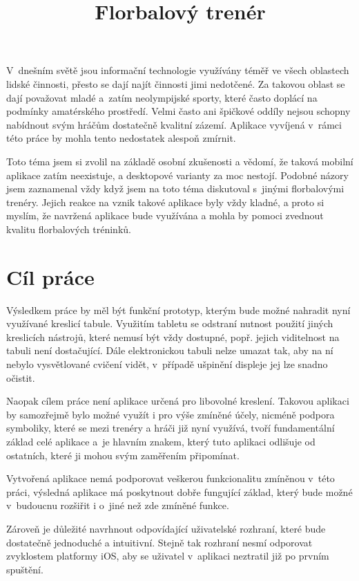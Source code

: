\documentclass[thesis=B,czech]{FITthesis}[2012/06/26]
\title{Florbalový trenér}
\begin{document}

\begin{introduction}
	V~dnešním světě jsou informační technologie využívány téměř ve všech oblastech lidské činnosti, přesto se dají najít činnosti jimi nedotčené. Za takovou oblast se dají považovat mladé a~zatím neolympijské sporty, které často doplácí na podmínky amatérského prostředí. Velmi často ani špičkové oddíly nejsou schopny nabídnout svým hráčům dostatečně kvalitní zázemí. Aplikace vyvíjená v~rámci této práce by mohla tento nedostatek alespoň zmírnit.

	Toto téma jsem si zvolil na základě osobní zkušenosti a vědomí, že taková mobilní aplikace zatím neexistuje, a desktopové varianty za moc nestojí. Podobné názory jsem zaznamenal vždy když jsem na toto téma diskutoval s~jinými florbalovými trenéry. Jejich reakce na vznik takové aplikace byly vždy kladné, a proto si myslím, že navržená aplikace bude využívána a mohla by pomoci zvednout kvalitu florbalových tréninků.
\end{introduction}

\chapter{Cíl práce}
	Výsledkem práce by měl být funkční prototyp, kterým bude možné nahradit nyní využívané kreslicí tabule. Využitím tabletu se odstraní nutnost použití jiných kreslicích nástrojů, které nemusí být vždy dostupné, popř. jejich viditelnost na tabuli není dostačující. Dále elektronickou tabuli nelze umazat tak, aby na ní nebylo vysvětlované cvičení vidět, v~případě ušpinění displeje jej lze snadno očistit.

	Naopak cílem práce není aplikace určená pro libovolné kreslení. Takovou aplikaci by samozřejmě bylo možné využít i pro výše zmíněné účely, nicméně podpora symboliky, které se mezi trenéry a hráči již nyní využívá, tvoří fundamentální základ celé aplikace a~je hlavním znakem, který tuto aplikaci odlišuje od ostatních, které ji mohou svým zaměřením připomínat.

	Vytvořená aplikace nemá podporovat veškerou funkcionalitu zmíněnou v~této práci, výsledná aplikace má poskytnout dobře fungující základ, který bude možné v~budoucnu rozšiřit i o~jiné než zde zmíněné funkce.

	Zároveň je důležité navrhnout odpovídající uživatelské rozhraní, které bude dostatečně jednoduché a intuitivní. Stejně tak rozhraní nesmí odporovat zvyklostem platformy iOS, aby se uživatel v~aplikaci neztratil již po prvním spuštění.
\end{document}
